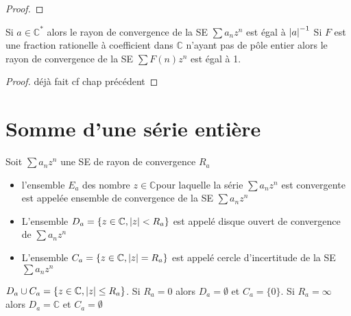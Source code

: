 \documentclass[11pt,hidelinks]{book}
\theoremstyle{mytheoremstyle}
\theoremstyle{mytheoremstyle}
\theoremstyle{mytheoremstyle}
\theoremstyle{mytheoremstyle}
\theoremstyle{mytheoremstyle}
\theoremstyle{mytheoremstyle}
\theoremstyle{mytheoremstyle}
\theoremstyle{mytheoremstyle}
\theoremstyle{myproblemstyle}
\def\mbb#1{\mathbb{#1}}
\def\bC{\mbb{C}}
\def\z{$z \in \bC$}
\def\se{\sum a_n z^n}
\begin{document}
\begin{adjustwidth}{-2em}{-1em}
\begin{prop}
\begin{proof}
        \end{proof}
    \end{prop}
    \begin{prop}
        Si $a \in \bC^*$ alors le rayon de convergence de la SE $\se$ est égal à $\abs{a}^{-1}$
        Si $F$ est une fraction rationelle à coefficient dans $\bC$ n'ayant pas de pôle entier alors 
        le rayon de convergence de la SE $\sum F(n) z^n$ est égal à 1.
        \begin{proof}
            déjà fait cf chap précédent
        \end{proof}
    \end{prop}

\end{adjustwidth}
\section{Somme d'une série entière}
\begin{definition}
    Soit $\se$ une SE de rayon de convergence $R_a$
    \begin{itemize}[label=$\circ$]
    \item l'ensemble $E_a$ des nombre \z pour laquelle 
    la série $\se$ est convergente est appelée ensemble 
    de convergence de la SE $\se$ 
    \item L'ensemble $D_a = \{z \in \bC, \abs{z} < R_a\}$ est appelé disque 
    ouvert de convergence de $\se$ 
    \item L'ensemble $C_a = \{z \in \bC, \abs{z} = R_a\}$ est appelé cercle d'incertitude
    de la SE $\se$ 
    \end{itemize}
\end{definition}
\begin{rmq}
    $D_a \cup C_a = \{z \in \bC, \abs{z} \leq R_a\}$. Si $R_a = 0$ 
    alors $D_a = \emptyset$ et $C_a = \{0\}$. Si $R_a = \infty$ alors 
    $D_a = \bC$ et $C_a = \emptyset$ 
\end{rmq}
\end{document}
